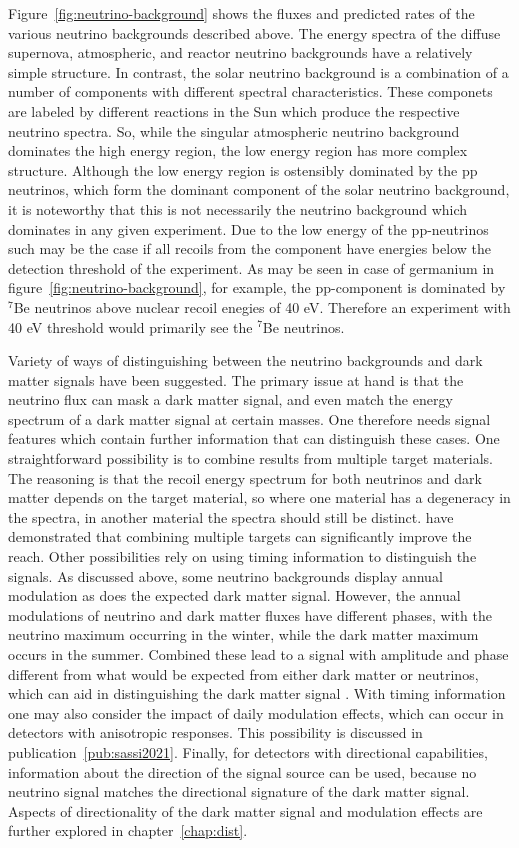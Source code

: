 \documentclass[b5paper, 10pt, twoside]{book}
\begin{document}
Figure~\ref{fig:neutrino-background} shows the fluxes and predicted rates of the various neutrino backgrounds described above. The energy spectra of the diffuse supernova, atmospheric, and reactor neutrino backgrounds have a relatively simple structure. In contrast, the solar neutrino background is a combination of a number of components with different spectral characteristics. These componets are labeled by different reactions in the Sun which produce the respective neutrino spectra. So, while the singular atmospheric neutrino background dominates the high energy region, the low energy region has more complex structure. Although the low energy region is ostensibly dominated by the pp neutrinos, which form the dominant component of the solar neutrino background, it is noteworthy that this is not necessarily the neutrino background which dominates in any given experiment. Due to the low energy of the pp-neutrinos such may be the case if all recoils from the component have energies below the detection threshold of the experiment. As may be seen in case of germanium in figure~\ref{fig:neutrino-background}, for example, the pp-component is dominated by $^{7}$Be neutrinos above nuclear recoil enegies of 40 eV. Therefore an experiment with 40 eV threshold would primarily see the $^{7}$Be neutrinos.

Variety of ways of distinguishing between the neutrino backgrounds and dark matter signals have been suggested. The primary issue at hand is that the neutrino flux can mask a dark matter signal, and even match the energy spectrum of a dark matter signal at certain masses. One therefore needs signal features which contain further information that can distinguish these cases. One straightforward possibility is to combine results from multiple target materials. The reasoning is that the recoil energy spectrum for both neutrinos and dark matter depends on the target material, so where one material has a degeneracy in the spectra, in another material the spectra should still be distinct. \textcite{BillardFigueroaFelicianoStrigari2014} have demonstrated that combining multiple targets can significantly improve the reach. Other possibilities rely on using timing information to distinguish the signals. As discussed above, some neutrino backgrounds display annual modulation as does the expected dark matter signal. However, the annual modulations of neutrino and dark matter fluxes have different phases, with the neutrino maximum occurring in the winter, while the dark matter maximum occurs in the summer. Combined these lead to a signal with amplitude and phase different from what would be expected from either dark matter or neutrinos, which can aid in distinguishing the dark matter signal \parencite{Davis2015}. With timing information one may also consider the impact of daily modulation effects, which can occur in detectors with anisotropic responses. This possibility is discussed in publication~\ref{pub:sassi2021}. Finally, for detectors with directional capabilities, information about the direction of the signal source can be used, because no neutrino signal matches the directional signature of the dark matter signal. Aspects of directionality of the dark matter signal and modulation effects are further explored in chapter~\ref{chap:dist}.
\end{document}
